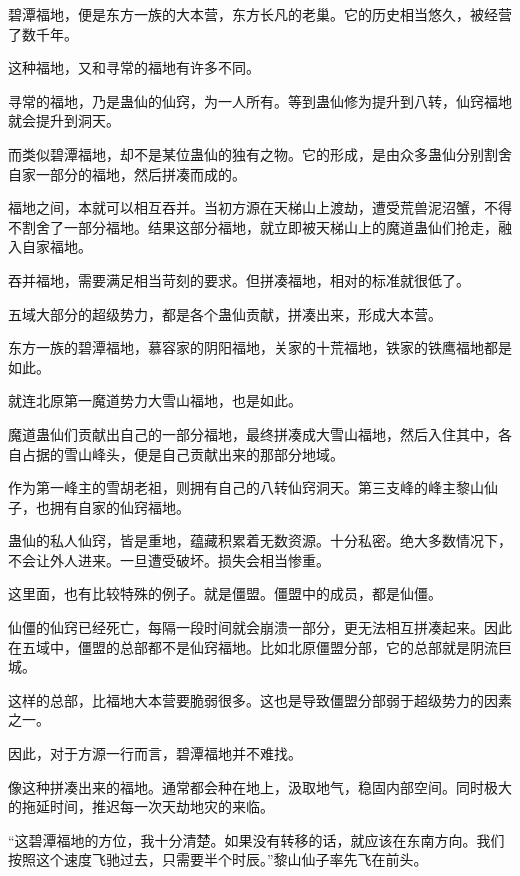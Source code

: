 
\begin{this_body}



碧潭福地，便是东方一族的大本营，东方长凡的老巢。它的历史相当悠久，被经营了数千年。

这种福地，又和寻常的福地有许多不同。

寻常的福地，乃是蛊仙的仙窍，为一人所有。等到蛊仙修为提升到八转，仙窍福地就会提升到洞天。

而类似碧潭福地，却不是某位蛊仙的独有之物。它的形成，是由众多蛊仙分别割舍自家一部分的福地，然后拼凑而成的。

福地之间，本就可以相互吞并。当初方源在天梯山上渡劫，遭受荒兽泥沼蟹，不得不割舍了一部分福地。结果这部分福地，就立即被天梯山上的魔道蛊仙们抢走，融入自家福地。

吞并福地，需要满足相当苛刻的要求。但拼凑福地，相对的标准就很低了。

五域大部分的超级势力，都是各个蛊仙贡献，拼凑出来，形成大本营。

东方一族的碧潭福地，慕容家的阴阳福地，关家的十荒福地，铁家的铁鹰福地都是如此。

就连北原第一魔道势力大雪山福地，也是如此。

魔道蛊仙们贡献出自己的一部分福地，最终拼凑成大雪山福地，然后入住其中，各自占据的雪山峰头，便是自己贡献出来的那部分地域。

作为第一峰主的雪胡老祖，则拥有自己的八转仙窍洞天。第三支峰的峰主黎山仙子，也拥有自家的仙窍福地。

蛊仙的私人仙窍，皆是重地，蕴藏积累着无数资源。十分私密。绝大多数情况下，不会让外人进来。一旦遭受破坏。损失会相当惨重。

这里面，也有比较特殊的例子。就是僵盟。僵盟中的成员，都是仙僵。

仙僵的仙窍已经死亡，每隔一段时间就会崩溃一部分，更无法相互拼凑起来。因此在五域中，僵盟的总部都不是仙窍福地。比如北原僵盟分部，它的总部就是阴流巨城。

这样的总部，比福地大本营要脆弱很多。这也是导致僵盟分部弱于超级势力的因素之一。

因此，对于方源一行而言，碧潭福地并不难找。

像这种拼凑出来的福地。通常都会种在地上，汲取地气，稳固内部空间。同时极大的拖延时间，推迟每一次天劫地灾的来临。

“这碧潭福地的方位，我十分清楚。如果没有转移的话，就应该在东南方向。我们按照这个速度飞驰过去，只需要半个时辰。”黎山仙子率先飞在前头。


\end{this_body}
